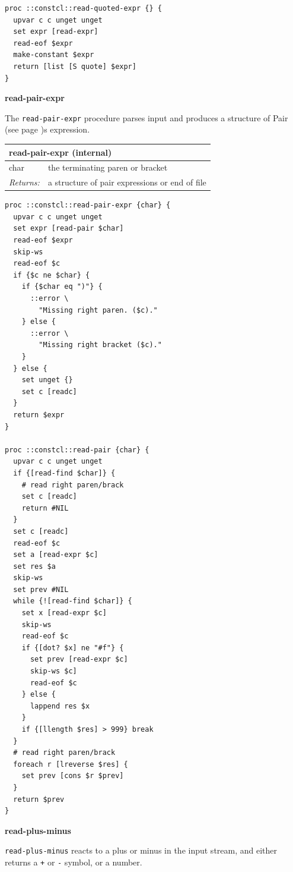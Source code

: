 \documentclass[twoside,9pt]{report}
\begin{document}
\noindent\makebox[\linewidth]{\rule{\linewidth}{0.4pt}}
\begin{lstlisting}
proc ::constcl::read-quoted-expr {} {
  upvar c c unget unget
  set expr [read-expr]
  read-eof $expr
  make-constant $expr
  return [list [S quote] $expr]
}
\end{lstlisting}
\noindent\makebox[\linewidth]{\rule{\linewidth}{0.4pt}}

\textbf{read-pair-expr}


The \texttt{read-pair-expr} procedure parses input and produces a structure of Pair (see page \pageref{pairs-and-lists})s expression.

\begin{tabular}{ |l l| }
\hline
\multicolumn{2}{|l|}{read-pair-expr (internal)} \\
\hline
char & the terminating paren or bracket \\
\textit{Returns:} & a structure of pair expressions or end of file \\
\hline
\end{tabular}

\noindent\makebox[\linewidth]{\rule{\linewidth}{0.4pt}}
\begin{lstlisting}
proc ::constcl::read-pair-expr {char} {
  upvar c c unget unget
  set expr [read-pair $char]
  read-eof $expr
  skip-ws
  read-eof $c
  if {$c ne $char} {
    if {$char eq ")"} {
      ::error \
        "Missing right paren. ($c)."
    } else {
      ::error \
        "Missing right bracket ($c)."
    }
  } else {
    set unget {}
    set c [readc]
  }
  return $expr
}
 
proc ::constcl::read-pair {char} {
  upvar c c unget unget
  if {[read-find $char]} {
    # read right paren/brack
    set c [readc]
    return #NIL
  }
  set c [readc]
  read-eof $c
  set a [read-expr $c]
  set res $a
  skip-ws
  set prev #NIL
  while {![read-find $char]} {
    set x [read-expr $c]
    skip-ws
    read-eof $c
    if {[dot? $x] ne "#f"} {
      set prev [read-expr $c]
      skip-ws $c]
      read-eof $c
    } else {
      lappend res $x
    }
    if {[llength $res] > 999} break
  }
  # read right paren/brack
  foreach r [lreverse $res] {
    set prev [cons $r $prev]
  }
  return $prev
}
\end{lstlisting}
\noindent\makebox[\linewidth]{\rule{\linewidth}{0.4pt}}

\textbf{read-plus-minus}


\texttt{read-plus-minus} reacts to a plus or minus in the input stream, and either returns a \texttt{+} or \texttt{-} symbol, or a number.
\end{document}
